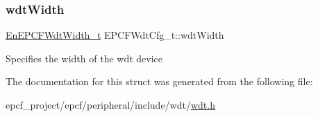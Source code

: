 \subsubsection{\texorpdfstring{wdt\+Width}{wdtWidth}}
{\footnotesize\ttfamily \mbox{\hyperlink{wdt_8h_a8b33815c75d82ba29955d84f9aead2ab}{En\+E\+P\+C\+F\+Wdt\+Width\+\_\+t}} E\+P\+C\+F\+Wdt\+Cfg\+\_\+t\+::wdt\+Width}

Specifies the width of the wdt device 

The documentation for this struct was generated from the following file\+:\begin{DoxyCompactItemize}
\item 
epcf\+\_\+project/epcf/peripheral/include/wdt/\mbox{\hyperlink{wdt_8h}{wdt.\+h}}\end{DoxyCompactItemize}

